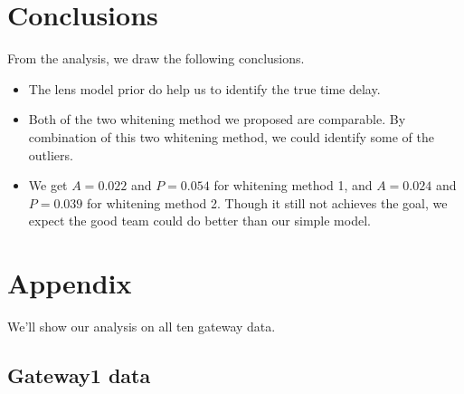 \documentclass[\docopts]{\docclass}
\begin{document}
\section{Conclusions}
\label{sec:conclusions}
From the analysis, we draw the following conclusions.
\begin{itemize}
  \item The lens model prior do help us to identify the true time delay. 
  \item Both of the two whitening method we proposed are comparable. By combination of this two whitening method, we could identify some of the outliers. 
  \item We get $A=0.022$ and $P=0.054$ for whitening method 1, and $A=0.024$ and $P=0.039$ for whitening method 2. Though it still not achieves the goal, we expect the good team could do better than our simple model.  
\end{itemize}






\section{Appendix}
We'll show our analysis on all ten gateway data. 
\subsection{Gateway1 data}
\end{document}

